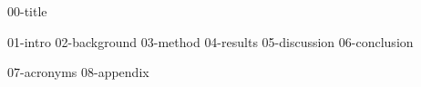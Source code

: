 \documentclass[runningheads]{llncs}
\begin{document}
 {00-title}

\begin{abstract}
 {00-abstract}
\end{abstract}

 {01-intro}
 {02-background}
 {03-method}
 {04-results}
 {05-discussion}
 {06-conclusion}




 {07-acronyms}
 {08-appendix}
\end{document}
